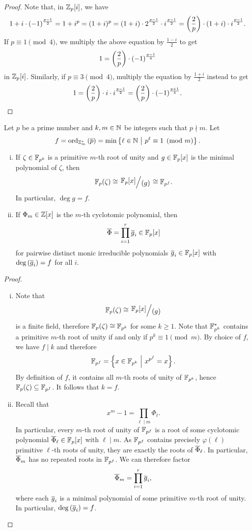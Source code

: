\begin{proof}
Note that, in $\mathbb{Z}_p[i]$, we have
\[
1 + i \cdot (-1)^{\frac{p-1}{2}} =
1 + i^p =
(1+i)^p =
(1+i) \cdot 2^{\frac{p-1}{2}} \cdot i^{\frac{p-1}{2}} =
\left(\frac{2}{p}\right) \cdot (1+i) \cdot i^{\frac{p-1}{2}}.
\]
If $p \equiv 1 \pmod{4}$, we multiply the above equation by
$\frac{1-i}{2}$ to get
\[
1 = \left(\frac{2}{p}\right) \cdot (-1)^{\frac{p-1}{4}}
\]
in $\mathbb{Z}_p[i]$. Similarly, if $p \equiv 3 \pmod{4}$, multiply the
equation by $\frac{1+i}{2}$ instead to get
\[
1 =
\left(\frac{2}{p}\right) \cdot i \cdot i^{\frac{p-1}{2}} =
\left(\frac{2}{p}\right) \cdot (-1)^{\frac{p+1}{4}}. \qedhere
\]
\end{proof}

\begin{trditev}
Let $p$ be a prime number and $k, m \in \mathbb{N}$ be integers such that
$p \nmid m$. Let
\[
f =
\operatorname{ord}_{\mathbb{Z}_m^*} \left(\overline{p}\right) =
\min \left\{\ell \in \mathbb{N}~\middle\vert~p^\ell \equiv 1 \pmod{m}\right\}.
\]

\begin{enumerate}[i)]
\item If $\zeta \in \mathbb{F}_{p^k}$ is a primitive $m$-th root of unity
and $g \in \mathbb{F}_p[x]$ is the minimal polynomial of $\zeta$, then
\[
\F_p(\zeta) \cong \kvoc{\F_p[x]}{(g)} \cong \F_{p^f}.
\]
In particular, $\deg g = f$.
\item If $\Phi_m \in \mathbb{Z}[x]$ is the $m$-th cyclotomic polynomial,
then
\[
\overline{\Phi} = \prod_{i=1}^r \overline{g}_i \in \mathbb{F}_p[x]
\]
for pairwise distinct monic irreducible polynomials
$\overline{g}_i \in \mathbb{F}_p[x]$ with $\deg \left(\overline{g}_i\right) = f$ for all
$i$.
\end{enumerate}
\end{trditev}

\begin{proof}
\phantom{i}
\begin{enumerate}[i)]
\item Note that
\[
\F_p(\zeta) \cong \kvoc{\F_p[x]}{(g)}
\]
is a finite field, therefore $\mathbb{F}_p(\zeta) \cong \mathbb{F}_{p^k}$ for some
$k \geq 1$. Note that $\mathbb{F}_{p^k}^*$ contains a primitive $m$-th
root of unity if and only if $p^k \equiv 1 \pmod{m}$. By choice
of $f$, we have $f \mid k$ and therefore
\[
\mathbb{F}_{p^f} = \left\{x \in \mathbb{F}_{p^k}~\middle\vert~x^{p^f} = x\right\}.
\]
By definition of $f$, it contains all $m$-th roots of unity of
$\mathbb{F}_{p^k}$, hence $\mathbb{F}_p(\zeta) \subseteq \mathbb{F}_{p^f}$. It follows that
$k=f$.
\item Recall that
\[
x^m-1 = \prod_{\ell \mid m} \Phi_\ell.
\]
In particular, every $m$-th root of unity of $\mathbb{F}_{p^f}$ is a root
of some cyclotomic polynomial $\overline{\Phi}_\ell \in \mathbb{F}_p[x]$ with
$\ell \mid m$. As $\mathbb{F}_{p^f}$ contains precisely $\varphi(\ell)$
primitive $\ell$-th roots of unity, they are exactly the roots of
$\overline{\Phi}_\ell$. In particular, $\overline{\Phi}_m$ has no
repeated roots in $\mathbb{F}_{p^f}$. We can therefore factor
\[
\overline{\Phi}_m = \prod_{i=1}^r \overline{g}_i,
\]
where each $\overline{g}_i$ is a minimal polynomial of some primitive
$m$-th root of unity. In particular, $\deg \left(\overline{g}_i\right) = f$.
\qedhere
\end{enumerate}
\end{proof}

